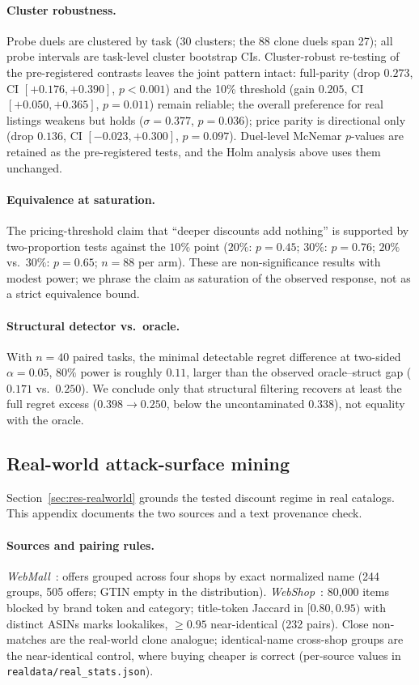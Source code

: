 \paragraph{Cluster robustness.} Probe duels are clustered by task (30
clusters; the 88 clone duels span 27); all probe intervals are
task-level cluster bootstrap CIs. Cluster-robust re-testing of the
pre-registered contrasts leaves the joint pattern intact: full-parity
(drop $0.273$, CI $[+0.176,+0.390]$, $p<0.001$) and the 10\% threshold
(gain $0.205$, CI $[+0.050,+0.365]$, $p=0.011$) remain reliable; the
overall preference for real listings weakens but holds ($\sigma=0.377$,
$p=0.036$); price parity is directional only (drop $0.136$, CI
$[-0.023,+0.300]$, $p=0.097$). Duel-level McNemar $p$-values are
retained as the pre-registered tests, and the Holm analysis above uses
them unchanged.

\paragraph{Equivalence at saturation.} The pricing-threshold claim that
``deeper discounts add nothing'' is supported by two-proportion tests
against the $10\%$ point ($20\%$: $p=0.45$; $30\%$: $p=0.76$; $20\%$ vs.\
$30\%$: $p=0.65$; $n{=}88$ per arm). These are non-significance results with modest power; we phrase the
claim as saturation of the observed response, not as a strict
equivalence bound.

\paragraph{Structural detector vs.\ oracle.} With $n{=}40$ paired tasks,
the minimal detectable regret difference at two-sided $\alpha=0.05$,
$80\%$ power is roughly $0.11$, larger than the observed oracle--struct
gap ($0.171$ vs.\ $0.250$). We conclude only that structural filtering
recovers at least the full regret excess ($0.398\to0.250$, below the
uncontaminated $0.338$), not equality with the oracle.

\subsection{Real-world attack-surface mining}
\label{sec:app-real}
Section~\ref{sec:res-realworld} grounds the tested discount regime in
real catalogs. This appendix documents the two sources and a text
provenance check.

\paragraph{Sources and pairing rules.}
\emph{WebMall}~\cite{peeters2025webmall}:
offers grouped across four shops by exact normalized name (244 groups,
505 offers; GTIN empty in the distribution). \emph{WebShop}~\cite{yao2022webshop}:
80{,}000 items blocked by brand token and category; title-token
Jaccard in $[0.80,0.95)$ with distinct ASINs marks lookalikes,
$\geq0.95$ near-identical (232 pairs). Close non-matches are the
real-world clone analogue; identical-name cross-shop groups are the
near-identical control, where buying cheaper is correct (per-source
values in \texttt{realdata/real\_stats.json}).

